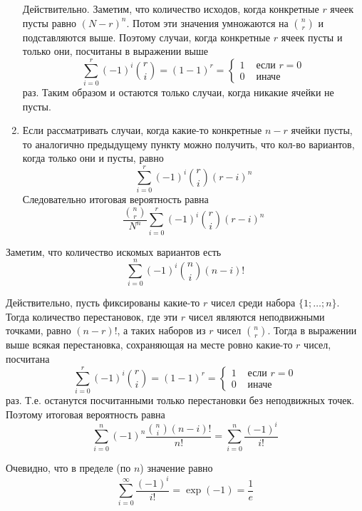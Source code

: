 \documentclass[12pt,a4paper]{article}
\begin{document}
\begin{problem}{23}
\begin{enumerate}
                Действительно. Заметим, что количество исходов, когда конкретные $r$ ячеек пусты равно $(N-r)^n$. Потом эти значения умножаются на $\binom{n}{r}$ и подставляются выше. Поэтому случаи, когда конкретные $r$ ячеек пусты и только они, посчитаны в выражении выше
                \[
                    \sum_{i=0}^r (-1)^i \binom{r}{i}
                    = (1 - 1)^r
                    = \begin{cases}
                        1& \text{ если $r = 0$}\\
                        0& \text{ иначе}
                    \end{cases}
                \]
                раз. Таким образом и остаются только случаи, когда никакие ячейки не пусты.
            
            \item Если рассматривать случаи, когда какие-то конкретные $n-r$ ячейки пусты, то аналогично предыдущему пункту можно получить, что кол-во вариантов, когда только они и пусты, равно
                \[\sum_{i=0}^r (-1)^i \binom{r}{i} (r-i)^n\]
                Следовательно итоговая вероятность равна
                \[\frac{\binom{n}{r}}{N^n}\sum_{i=0}^r (-1)^i \binom{r}{i} (r-i)^n\]
        \end{enumerate}
    \end{problem}

    \begin{problem}{24}
        Заметим, что количество искомых вариантов есть
        \[\sum_{i=0}^n (-1)^i \binom{n}{i} (n-i)!\]
        
        Действительно, пусть фиксированы какие-то $r$ чисел среди набора $\{1; \dots; n\}$. Тогда количество перестановок, где эти $r$ чисел являются неподвижными точками, равно $(n-r)!$, а таких наборов из $r$ чисел $\binom{n}{r}$. Тогда в выражении выше всякая перестановка, сохраняющая на месте ровно какие-то $r$ чисел, посчитана
        \[
            \sum_{i=0}^r (-1)^i \binom{r}{i}
            = (1 - 1)^r
            = \begin{cases}
                1& \text{ если $r = 0$}\\
                0& \text{ иначе}
            \end{cases}
        \]
        раз. Т.е. останутся посчитанными только перестановки без неподвижных точек. Поэтому итоговая вероятность равна
        \[\sum_{i=0}^n (-1)^n \frac{\binom{n}{i} (n-i)!}{n!} = \sum_{i=0}^n \frac{(-1)^i}{i!}\]

        Очевидно, что в пределе (по $n$) значение равно
        \[\sum_{i=0}^\infty \frac{(-1)^i}{i!} = \exp(-1) = \frac{1}{e}\]
    \end{problem}
\end{document}
